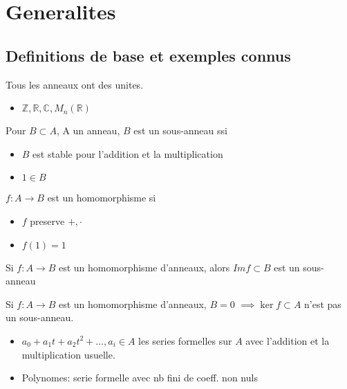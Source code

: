 \documentclass[../main.tex]{subfiles}
\begin{document}
\section{Generalites}
\subsection{Definitions de base et exemples connus}
Tous les anneaux ont des unites.
\begin{exemple}
\begin{itemize}
\item $\mathbb{Z}, \mathbb{R}, \mathbb{C}, M_n( \mathbb{R}) $ 
\end{itemize}

\end{exemple}
\begin{defn}
	Pour $B \subset A$, A un anneau, $B$ est un sous-anneau ssi 
	\begin{itemize}
	\item $B$ est stable pour l'addition et la multiplication
	\item $1\in B$ 
	\end{itemize}
		
\end{defn}
\begin{defn}
	$f:A\to B$ est un homomorphisme si
	\begin{itemize}
	\item $f$ preserve $+,\cdot$ 
	\item $f( 1) =1$ 
	\end{itemize}
		
\end{defn}
\begin{propo}
Si $f:A\to B$ est un homomorphisme d'anneaux, alors $Im f \subset B$ est un sous-anneau
\end{propo}
\begin{propo}
Si $f:A\to B$ est un homomorphisme d'anneaux, $B=0$ $\implies \ker f \subset A$ n'est pas un sous-anneau.
\end{propo}
\begin{exemple}
\begin{itemize}
\item $a_0+a_1t+ a_2t^{2}+\ldots, a_i \in A$ les series formelles sur $A$ avec l'addition et la multiplication usuelle.
\item Polynomes: serie formelle avec nb fini de coeff. non nuls
\end{itemize}

\end{exemple}
\end{document}
